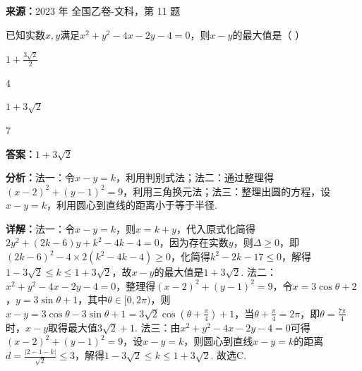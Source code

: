 \begin{question}[points=5]
\textbf{来源：}2023 年 全国乙卷-文科，第 11 题\par
已知实数$x,y$满足$x^2+y^2-4x-2y-4=0$，则$x-y$的最大值是（   ）
\begin{choices}
  \item $1+\frac{3\sqrt{2}}{2}$
  \item $4$
  \item $1+3\sqrt{2}$
  \item $7$
\end{choices}
\begin{solution}
\textbf{答案：}$1+3\sqrt{2}$

\textbf{分析：}法一：令$x-y=k$，利用判别式法；法二：通过整理得$(x-2)^2+(y-1)^2=9$，利用三角换元法；法三：整理出圆的方程，设$x-y=k$，利用圆心到直线的距离小于等于半径.

\textbf{详解：}法一：令$x-y=k$，则$x=k+y$，代入原式化简得$2y^2+(2k-6)y+k^2-4k-4=0$，因为存在实数$y$，则$\Delta\ge0$，即$(2k-6)^2-4\times2(k^2-4k-4)\ge0$，化简得$k^2-2k-17\le0$，解得$1-3\sqrt2\le k\le1+3\sqrt2$，故$x-y$的最大值是$1+3\sqrt2$.
法二：$x^2+y^2-4x-2y-4=0$，整理得$(x-2)^2+(y-1)^2=9$，令$x=3\cos\theta+2$，$y=3\sin\theta+1$，其中$\theta\in[0,2\pi)$，则$x-y=3\cos\theta-3\sin\theta+1=3\sqrt2\cos(\theta+\frac{\pi}{4})+1$，当$\theta+\frac{\pi}{4}=2\pi$，即$\theta=\frac{7\pi}{4}$时，$x-y$取得最大值$3\sqrt2+1$.
法三：由$x^2+y^2-4x-2y-4=0$可得$(x-2)^2+(y-1)^2=9$，设$x-y=k$，则圆心到直线$x-y=k$的距离$d=\frac{|2-1-k|}{\sqrt2}\le3$，解得$1-3\sqrt2\le k\le1+3\sqrt2$. 故选C.
\end{solution}
\end{question}

